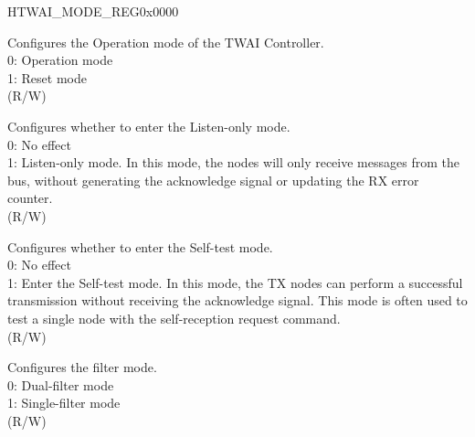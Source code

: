 \begin{register}{H}{TWAI\_MODE\_REG}{0x0000}\label{regdesc:TWAIMODEREG}
%
%
%
%
%
\regnewline%
\begin{regdesc}\begin{reglist}
\label{fielddesc:TWAIRESETMODE}\item [TWAI\_RESET\_MODE] Configures the Operation mode of the TWAI Controller. \\
0: Operation mode\\
1: Reset mode \\
(R/W)
\label{fielddesc:TWAILISTENONLYMODE}\item [TWAI\_LISTEN\_ONLY\_MODE] Configures whether to enter the Listen-only mode. \\
0: No effect\\
1: Listen-only mode. In this mode, the nodes will only receive messages from the bus, without generating the acknowledge signal or updating the RX error counter. \\
(R/W)
\label{fielddesc:TWAISELFTESTMODE}\item [TWAI\_SELF\_TEST\_MODE] Configures whether to enter the Self-test mode. \\
0: No effect\\
1: Enter the Self-test mode. In this mode, the TX nodes can perform a successful transmission without receiving the acknowledge signal. This mode is often used to test a single node with the self-reception request command. \\
(R/W)
\label{fielddesc:TWAIRXFILTERMODE}\item [TWAI\_RX\_FILTER\_MODE] Configures the filter mode.\\
0: Dual-filter mode\\
1: Single-filter mode \\
(R/W)
\end{reglist}\end{regdesc}
\end{register}


